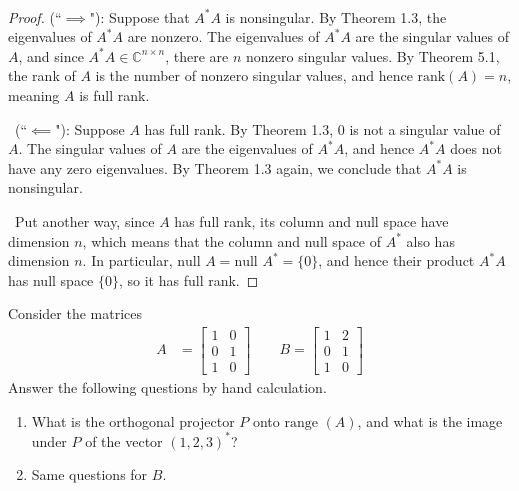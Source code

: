 \documentclass[12pt]{article}
\newenvironment{ex}[2][Exercise]{\begin{trivlist}
		\item[\hskip \labelsep {\bfseries #1}\hskip \labelsep {\bfseries #2.}]}{\end{trivlist}}
\newenvironment{sol}[1][Solution]{\begin{trivlist}
		\item[\hskip \labelsep {\bfseries #1:}]}{\end{trivlist}}
\begin{document}
\begin{sol}
	\
	\begin{proof}
		(``$\implies$"): Suppose that $A^*A$ is nonsingular. By Theorem 1.3, the eigenvalues of $A^*A$ are
		nonzero. The eigenvalues of $A^*A$ are the singular values of $A$, and since $A^*A\in\mathbb{C}^{n\times n}$,
		there are $n$ nonzero singular values. By Theorem 5.1, the rank of $A$ is the number of nonzero singular
		values, and hence $\text{rank}(A)=n$, meaning $A$ is full rank.
		
		\
		(``$\impliedby$"): Suppose $A$ has full rank. By Theorem 1.3, $0$ is not a singular value of $A$.
		The singular values of $A$ are the eigenvalues of $A^*A$, and hence $A^*A$ does not have any zero
		eigenvalues. By Theorem 1.3 again, we conclude that $A^*A$ is nonsingular.
		
		\
		Put another way, since $A$ has full rank, its column and null space have dimension $n$, which means
		that the column and null space of $A^*$ also has dimension $n$. In particular, $\text{null }A=\text{null }A^*=\{0\}$, and hence their product $A^*A$ has null space $\{0\}$, so it has full rank.
	\end{proof}
\end{sol}

\begin{ex}{4}
	Consider the matrices
	\begin{align*}
		A&=\begin{bmatrix}
			1 & 0\\
			0 & 1\\
			1 & 0
		\end{bmatrix}
		\quad\quad
		B=\begin{bmatrix}
			1 & 2\\
			0 & 1\\
			1 & 0
		\end{bmatrix}
	\end{align*}
	Answer the following questions by hand calculation.
	\begin{enumerate}[label=(\alph*)]
		\item What is the orthogonal projector $P$ onto $\text{range }(A)$, and what is the image under $P$
		of the vector $(1,2,3)^*$?
		\item Same questions for $B$.
	\end{enumerate}
\end{ex}
\end{document}
